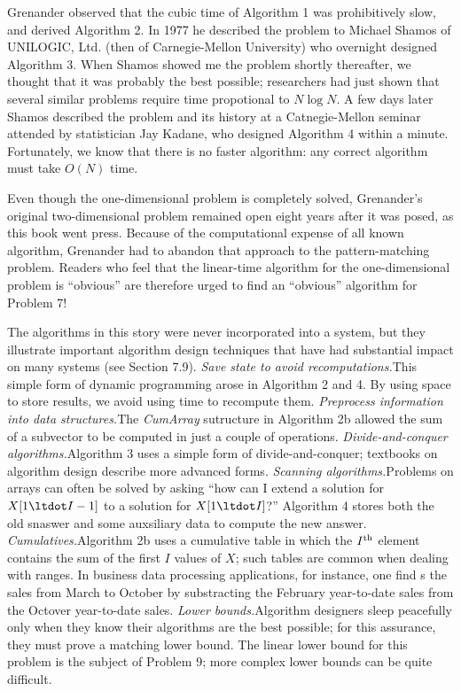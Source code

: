 Grenander observed that the cubic time of Algorithm 1 was prohibitively slow, and
derived Algorithm 2. In 1977 he described the problem to Michael Shamos of
UNILOGIC, Ltd. (then of Carnegie-Mellon University) who overnight designed
Algorithm 3. When Shamos showed me the problem shortly thereafter, we thought
that it was probably the best possible; researchers had just shown that several
similar problems require time propotional to $N\log N.$ A few days later Shamos
described the problem and its history at a Catnegie-Mellon seminar attended by
statistician Jay Kadane, who designed Algorithm 4 within a minute. Fortunately,
we know that there is no faster algorithm: any correct algorithm must take $O(N)$
time.

Even though the one-dimensional problem is completely solved, Grenander's
original two-dimensional problem remained open eight years after it was posed, as
this book went press. Because of the computational expense of all known
algorithm, Grenander had to abandon that approach to the pattern-matching
problem. Readers who feel that the linear-time algorithm for the one-dimensional
problem is ``obvious'' are therefore urged to find an ``obvious'' algorithm for
Problem 7!

The algorithms in this story were never incorporated into a system, but they
illustrate important algorithm design techniques that have had substantial
impact on many systems (see Section 7.9).
\smallskip
\more
{\it Save state to avoid recomputations.}\enspace This simple form of dynamic
programming arose in Algorithm 2 and 4. By using space to store results, we avoid
using time to recompute them.
\smallskip
\more
{\it Preprocess information into data structures.}\enspace The {\it CumArray\/}
sutructure in Algorithm 2b allowed the sum of a subvector to be computed in just
a couple of operations.
\smallskip
\more
{\it Divide-and-conquer algorithms.}\enspace Algorithm 3 uses a simple form of
divide-and-conquer; textbooks on algorithm design describe more advanced forms.
\smallskip
\more
{\it Scanning algorithms.}\enspace Problems on arrays can often be solved by
asking ``how can I extend a solution for $X[1\ltdot I-1]$ to a solution for $X[1
\ltdot I]$?'' Algorithm 4 stores both the old snaswer and some auxsiliary data to
compute the new answer.
\smallskip
\more
{\it Cumulatives.}\enspace Algorithm 2b uses a cumulative table in which the $I^
{\rm th}$ element contains the sum of the first $I$ values of $X$; such tables
are common when dealing with ranges. In business data processing applications,
for instance, one find s the sales from March to October by substracting the
February year-to-date sales from the Octover year-to-date sales.
\smallskip
\more
{\it Lower bounds.}\enspace Algorithm designers sleep peacefully only when they
know their algorithms are the best possible; for this assurance, they must prove
a matching lower bound. The linear lower bound for this problem is the subject
of Problem 9; more complex lower bounds can be quite difficult.

